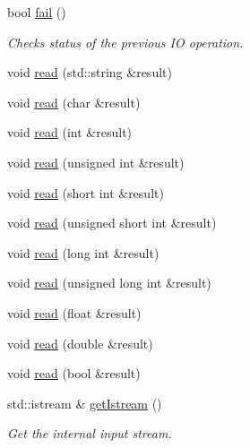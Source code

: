 \begin{DoxyCompactItemize}
bool \mbox{\hyperlink{classENSEM_1_1TextReader_ae21c25d2a62a1b242b09d745a314af69}{fail}} ()
\begin{DoxyCompactList}\small\item\em Checks status of the previous IO operation. \end{DoxyCompactList}\item 
void \mbox{\hyperlink{classENSEM_1_1TextReader_acbeb934e3316e4cf0c74d23dbe473d19}{read}} (std\+::string \&result)
\item 
void \mbox{\hyperlink{classENSEM_1_1TextReader_acfa438667353be1fd79c0170344eefe8}{read}} (char \&result)
\item 
void \mbox{\hyperlink{classENSEM_1_1TextReader_a674bcd7e14e71926e02d70939876ef56}{read}} (int \&result)
\item 
void \mbox{\hyperlink{classENSEM_1_1TextReader_aa35f21aaaa60529fe88ca35b13727d68}{read}} (unsigned int \&result)
\item 
void \mbox{\hyperlink{classENSEM_1_1TextReader_a74b47b82fb54027158d1623307f6e8c1}{read}} (short int \&result)
\item 
void \mbox{\hyperlink{classENSEM_1_1TextReader_a94c542aaec54ff618064c61e8602eefa}{read}} (unsigned short int \&result)
\item 
void \mbox{\hyperlink{classENSEM_1_1TextReader_a6175ad804f9b13604f1cc7466a95725a}{read}} (long int \&result)
\item 
void \mbox{\hyperlink{classENSEM_1_1TextReader_a88188c5da2fe2882d38e7f8fa70b6e29}{read}} (unsigned long int \&result)
\item 
void \mbox{\hyperlink{classENSEM_1_1TextReader_a67d7171b0abb40a3c33c7cc92452d78f}{read}} (float \&result)
\item 
void \mbox{\hyperlink{classENSEM_1_1TextReader_ac12d688ee2475e365919e16183b0c816}{read}} (double \&result)
\item 
void \mbox{\hyperlink{classENSEM_1_1TextReader_a0aa4b524a014a6c53980d4717b48b733}{read}} (bool \&result)
\item 
std\+::istream \& \mbox{\hyperlink{classENSEM_1_1TextReader_a855b7272df1bd50c18f730f3ac882428}{get\+Istream}} ()
\begin{DoxyCompactList}\small\item\em Get the internal input stream. \end{DoxyCompactList}\end{DoxyCompactItemize}
